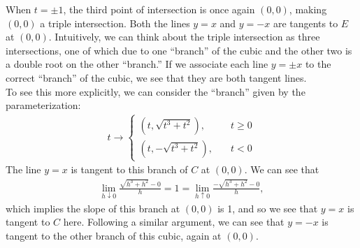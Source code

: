 \documentclass[12pt]{article}
\newcommand{\f}[2]{\frac{#1}{#2}}
\begin{document}
\noindent When $t = \pm 1$, the third point of intersection is once again $(0,0)$, making $(0,0)$ a triple intersection. Both the lines $y = x$ and $y = -x$ are tangents to $E$ at $(0,0)$. Intuitively, we can think about the triple intersection as three intersections, one of which due to one ``branch'' of the cubic and the other two is a double root on the other ``branch.'' If we associate each line $y = \pm x$ to the correct ``branch'' of the cubic, we see that they are both tangent lines. \\

\noindent To see this more explicitly, we can consider the ``branch'' given by the parameterization:
\begin{align}
t \to \begin{cases}
(t, \sqrt{t^3+t^2}), &\quad t \geq 0\\
(t, -\sqrt{t^3+t^2}), &\quad t < 0
\end{cases}
\end{align} 
The line $y = x$ is tangent to this branch of $C$ at $(0,0)$. We can see that
\begin{align}
\lim\limits_{h \downarrow 0} \f{\sqrt{h^3+h^2} - 0}{h} =  1 = \lim\limits_{h\uparrow 0}\f{-\sqrt{h^3+h^2} - 0}{h},
\end{align}
which implies the slope of this branch at $(0,0)$ is 1, and so we see that $y=x$ is tangent to $C$ here. Following a similar argument, we can see that $y = -x$ is tangent to the other branch of this cubic, again at $(0,0)$. 


\newpage
\end{document}
